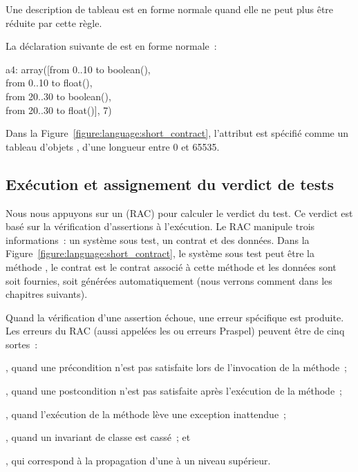 Une description de tableau est en forme normale quand elle ne peut plus être
réduite par cette règle.

\begin{example}

La déclaration suivante de  est en forme normale~:

\begin{pre}
a4: array([from  0..10 to boolean(), \\
           from  0..10 to float(), \\
           from 20..30 to boolean(), \\
           from 20..30 to float()], 7)
\end{pre}

\end{example}

Dans la Figure~\ref{figure:language:short_contract}, l'attribut  est
spécifié comme un tableau d'objets , d'une longueur entre 0 et 65535.

\subsection{Exécution et assignement du verdict de tests}
\label{subsection:language:verdict}

Nous nous appuyons sur un  (RAC) pour
calculer le verdict du test. Ce verdict est basé sur la vérification
d'assertions à l'exécution. Le RAC manipule trois informations~: un système sous
test, un contrat et des données. Dans la
Figure~\ref{figure:language:short_contract}, le système sous test peut être la
méthode , le contrat est le contrat associé à cette méthode et les
données sont soit fournies, soit générées automatiquement (nous verrons comment
dans les chapitres suivants).

Quand la vérification d'une assertion échoue, une erreur spécifique est
produite. Les erreurs du RAC (aussi appelées les 
ou erreurs Praspel) peuvent être de cinq sortes~:
%
\begin{inparaenum}[$(i)$]
%
\item {}, quand une précondition n'est pas
satisfaite lors de l'invocation de la méthode~;
%
\item {}, quand une postcondition n'est pas
satisfaite après l'exécution de la méthode~;
%
\item {}, quand l'exécution de la méthode lève une
exception inattendue~;
%
\item {}, quand un invariant de classe est cassé~; et
%
\item {}, qui correspond à la propagation
d'une  à un niveau supérieur.
%
\end{inparaenum}

